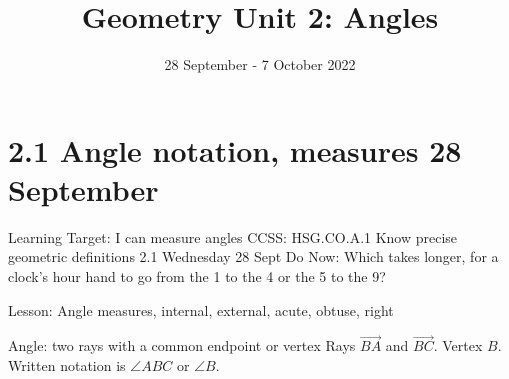 

\title{Geometry Unit 2: Angles}
\date{28 September - 7 October 2022}


\frame{\titlepage}

\section[Outline]{}
\frame{\tableofcontents}

\section{2.1 Angle notation, measures \hfill 28 September}
\begin{frame}{Learning Target: I can measure angles}
  {CCSS: HSG.CO.A.1 Know precise geometric definitions \hfill \alert{2.1 Wednesday 28 Sept}}
  Do Now: Which takes longer, for a clock's hour hand to go from the 1 to the 4 or the 5 to the 9? \par \bigskip
     \par \bigskip
  Lesson: Angle measures, internal, external, acute, obtuse, right
\end{frame}

\begin{frame}{Angle: two rays with a common endpoint or vertex}
  Rays $\overrightarrow{BA}$ and $\overrightarrow{BC}$. Vertex $B$.
  Written notation is $\angle ABC$ or $\angle B$. \\[0.75cm]
        \begin{center}
          \end{center}
    \end{frame}

